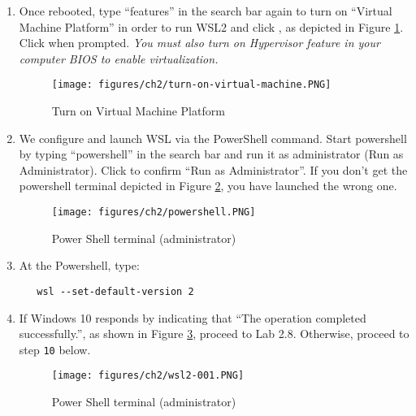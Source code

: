 \begin{enumerate}
\item Once rebooted, type ``features'' in the search bar again to turn on ``Virtual Machine Platform'' in order to run WSL2 and click {}, as depicted in Figure \ref{fig:virt-machine}. Click {} when prompted. {\it{You must also turn on Hypervisor feature in your computer BIOS to enable virtualization.}} 
\begin{figure}[hbt!]\centering
\texttt{[image: figures/ch2/turn-on-virtual-machine.PNG]}
\caption{Turn on Virtual Machine Platform}\label{fig:virt-machine} %
\end{figure}

\item We configure and launch WSL via the PowerShell command. Start powershell by typing ``powershell'' in the search bar and run it as administrator (Run as Administrator). Click {} to confirm ``Run as Administrator''. If you don't get the powershell terminal depicted in Figure \ref{fig:powershell}, you have launched the wrong one. 
\begin{figure}[hbt!]\centering
\texttt{[image: figures/ch2/powershell.PNG]}
\caption{Power Shell terminal (administrator)}\label{fig:powershell} %
\end{figure}

\item At the Powershell, type: 
\begin{verbatim}
   wsl --set-default-version 2
\end{verbatim}

\item If Windows 10 responds by indicating that ``The operation completed successfully.'', as shown in Figure \ref{fig:wsl2-update}, proceed to Lab 2.8. Otherwise, proceed to step {\tt{10}} below. 
\begin{figure}[hbt!]\centering
\texttt{[image: figures/ch2/wsl2-001.PNG]}
\caption{Power Shell terminal (administrator)}\label{fig:wsl2-update} %
\end{figure}


\end{enumerate}
